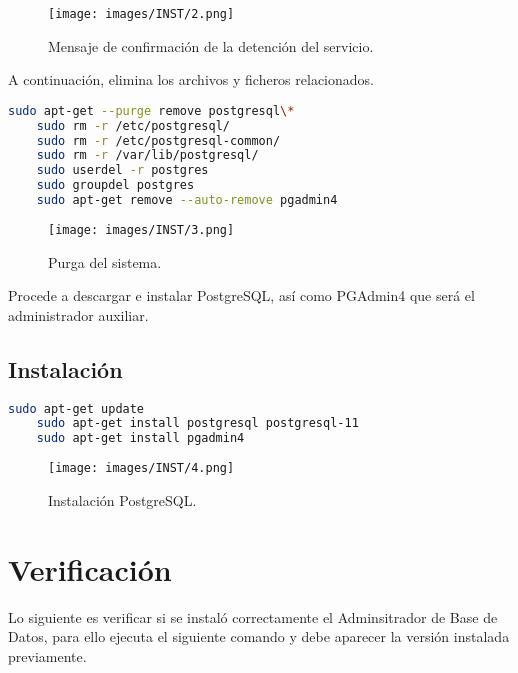 \begin{figure}[htbp!]
	\begin{center}
		\texttt{[image: images/INST/2.png]}
		\caption{Mensaje de confirmación de la detención del servicio.}
	\end{center}
\end{figure}

\bigbreak
A continuaci\'on, elimina los archivos y ficheros relacionados.

\begin{lstlisting}[language=bash]
    sudo apt-get --purge remove postgresql\*
    sudo rm -r /etc/postgresql/
    sudo rm -r /etc/postgresql-common/
    sudo rm -r /var/lib/postgresql/
    sudo userdel -r postgres
    sudo groupdel postgres
    sudo apt-get remove --auto-remove pgadmin4
\end{lstlisting}

\begin{figure}[htbp!]
	\begin{center}
		\texttt{[image: images/INST/3.png]}
		\caption{Purga del sistema.}
	\end{center}
\end{figure}

\bigbreak
Procede a descargar e instalar PostgreSQL, as\'i como PGAdmin4 que ser\'a el administrador auxiliar.

\subsection{Instalaci\'on}
\begin{lstlisting}[language=bash]
    sudo apt-get update
    sudo apt-get install postgresql postgresql-11
    sudo apt-get install pgadmin4
\end{lstlisting}

\begin{figure}[htbp!]
	\begin{center}
		\texttt{[image: images/INST/4.png]}
		\caption{Instalación PostgreSQL.}
	\end{center}
\end{figure}

\bigbreak
\section{Verificación}

Lo siguiente es verificar si se instal\'o correctamente el Adminsitrador de Base de Datos, para ello ejecuta el siguiente comando y debe aparecer la versi\'on instalada previamente.

